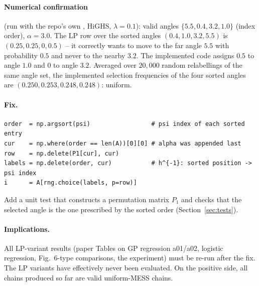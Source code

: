\documentclass[11pt,a4paper]{article}
\theoremstyle{remark}
\begin{document}
\paragraph{Numerical confirmation} (run with the repo's own , HiGHS, $\lambda=0.1$): valid angles $\{5.5, 0.4, 3.2, 1.0\}$ (index order), $\alpha=3.0$. The LP row over the sorted angles $(0.4,1.0,3.2,5.5)$ is $(0.25,0.25,0,0.5)$ -- it correctly wants to move to the far angle $5.5$ with probability $0.5$ and never to the nearby $3.2$. The implemented code assigns $0.5$ to angle $1.0$ and $0$ to angle $3.2$. Averaged over $20{,}000$ random relabellings of the same angle set, the implemented selection frequencies of the four sorted angles are $(0.250, 0.253, 0.248, 0.248)$: uniform.

\paragraph{Fix.}
\begin{lstlisting}
order  = np.argsort(psi)                 # psi index of each sorted entry
cur    = np.where(order == len(A))[0][0] # alpha was appended last
row    = np.delete(P1[cur], cur)
labels = np.delete(order, cur)           # h^{-1}: sorted position -> psi index
i      = A[rng.choice(labels, p=row)]
\end{lstlisting}
Add a unit test that constructs a permutation matrix $P_1$ and checks that the selected angle is the one prescribed by the sorted order (Section~\ref{sec:tests}).

\paragraph{Implications.} All LP-variant results (paper Tables on GP regression a01/a02, logistic regression, Fig.~6-type comparisons, the  experiment) must be re-run after the fix. The LP variants have effectively never been evaluated. On the positive side, all chains produced so far are valid uniform-MESS chains.
\end{document}
